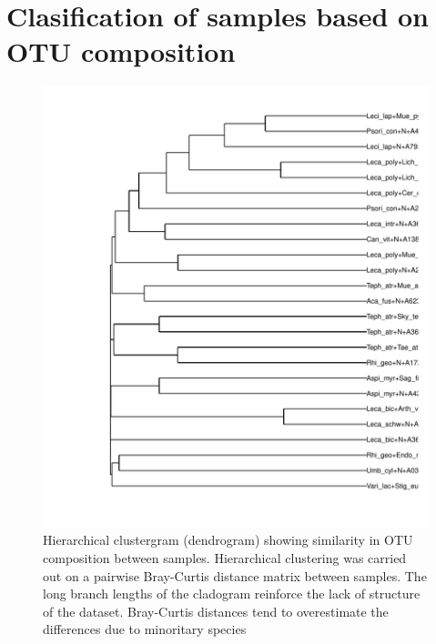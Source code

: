 \documentclass[a4paper, 11]{article}\usepackage[]{graphicx}\usepackage[]{color}
\makeatletter
\def\maxwidth{ %
  \ifdim\Gin@nat@width>\linewidth
    \linewidth
  \else
    \Gin@nat@width
  \fi
}
\newenvironment{knitrout}{}{} %
\makeatother
\begin{document}
\section{Clasification of samples based on OTU composition}
\begin{knitrout}
\color{fgcolor}\begin{figure}[H]
\includegraphics[width=\maxwidth]{figure/foo_tree-1} \caption[Hierarchical clustergram (dendrogram) showing similarity in OTU composition between samples]{Hierarchical clustergram (dendrogram) showing similarity in OTU composition between samples. Hierarchical clustering was carried out on a pairwise Bray-Curtis distance matrix between samples. The long branch lengths of the cladogram reinforce the lack of structure of the dataset. Bray-Curtis distances tend to overestimate the differences due to minoritary species}\label{fig:foo_tree}
\end{figure}


\end{knitrout}
\end{document}
